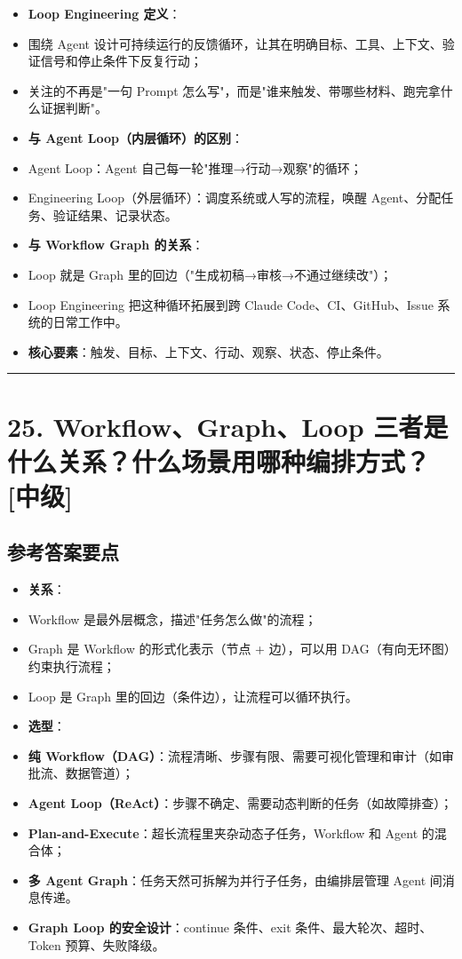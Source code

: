 \documentclass[9pt,a4paper,twocolumn]{ctexart}
\newcommand{\lvzhong}{\usebox{\badgezhongbox}}
\def\lvzhong{[中级]}%
\begin{document}
\begin{itemize}[itemsep=1pt, topsep=2pt]
  \item \textbf{Loop Engineering 定义}：
  \item 围绕 Agent 设计可持续运行的反馈循环，让其在明确目标、工具、上下文、验证信号和停止条件下反复行动；
  \item 关注的不再是"一句 Prompt 怎么写"，而是"谁来触发、带哪些材料、跑完拿什么证据判断"。
  \item \textbf{与 Agent Loop（内层循环）的区别}：
  \item Agent Loop：Agent 自己每一轮"推理→行动→观察"的循环；
  \item Engineering Loop（外层循环）：调度系统或人写的流程，唤醒 Agent、分配任务、验证结果、记录状态。
  \item \textbf{与 Workflow Graph 的关系}：
  \item Loop 就是 Graph 里的回边（"生成初稿→审核→不通过继续改"）；
  \item Loop Engineering 把这种循环拓展到跨 Claude Code、CI、GitHub、Issue 系统的日常工作中。
  \item \textbf{核心要素}：触发、目标、上下文、行动、观察、状态、停止条件。
\end{itemize}


\vspace{2pt}
\noindent\rule{\columnwidth}{0.3pt}\vspace{2pt}



\section*{25. Workflow、Graph、Loop 三者是什么关系？什么场景用哪种编排方式？ \lvzhong{}}


\subsection*{参考答案要点}

\begin{itemize}[itemsep=1pt, topsep=2pt]
  \item \textbf{关系}：
  \item Workflow 是最外层概念，描述"任务怎么做"的流程；
  \item Graph 是 Workflow 的形式化表示（节点 + 边），可以用 DAG（有向无环图）约束执行流程；
  \item Loop 是 Graph 里的回边（条件边），让流程可以循环执行。
  \item \textbf{选型}：
  \item \textbf{纯 Workflow（DAG）}：流程清晰、步骤有限、需要可视化管理和审计（如审批流、数据管道）；
  \item \textbf{Agent Loop（ReAct）}：步骤不确定、需要动态判断的任务（如故障排查）；
  \item \textbf{Plan-and-Execute}：超长流程里夹杂动态子任务，Workflow 和 Agent 的混合体；
  \item \textbf{多 Agent Graph}：任务天然可拆解为并行子任务，由编排层管理 Agent 间消息传递。
  \item \textbf{Graph Loop 的安全设计}：continue 条件、exit 条件、最大轮次、超时、Token 预算、失败降级。
\end{itemize}
\end{document}

